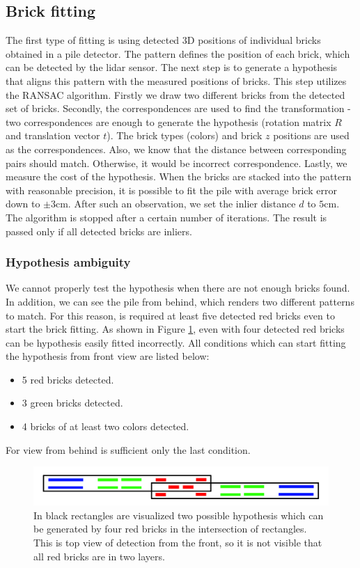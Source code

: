 \subsection{Brick fitting}
The first type of fitting is using detected 3D positions of individual bricks obtained in a pile detector. The pattern defines the position of each brick, which can be detected by the lidar sensor. The next step is to generate a hypothesis that aligns this pattern with the measured positions of bricks. This step utilizes the RANSAC algorithm. Firstly we draw two different bricks from the detected set of bricks. Secondly, the correspondences are used to find the transformation - two correspondences are enough to generate the hypothesis (rotation matrix $R$ and translation vector $t$). The brick types (colors) and brick $z$ positions are used as the correspondences. Also, we know that the distance between corresponding pairs should match. Otherwise, it would be incorrect correspondence. Lastly, we measure the cost of the hypothesis. When the bricks are stacked into the pattern with reasonable precision, it is possible to fit the pile with average brick error down to $\pm 3$cm. After such an observation, we set the inlier distance $d$ to $5$cm. The algorithm is stopped after a certain number of iterations. The result is passed only if all detected bricks are inliers.

\subsubsection{Hypothesis ambiguity}
We cannot properly test the hypothesis when there are not enough bricks found. In addition, we can see the pile from behind, which renders two different patterns to match. For this reason, is required at least five detected red bricks even to start the brick fitting. As shown in Figure \ref{fig:ambiguity}, even with four detected red bricks can be hypothesis easily fitted incorrectly. All conditions which can start fitting the hypothesis from front view are listed below:
\begin{itemize}
\item 5 red bricks detected.
\item 3 green bricks detected.
\item 4 bricks of at least two colors detected.
\end{itemize}
For view from behind is sufficient only the last condition.
\begin{figure}[H]
\centering
\includegraphics[scale=0.3]{fig/ambiguous.png}
\caption[Hypothesis ambiguity]{In black rectangles are visualized two possible hypothesis which can be generated by four red bricks in the intersection of rectangles. This is top view of detection from the front, so it is not visible that all red bricks are in two layers.}
\label{fig:ambiguity}
\end{figure}

